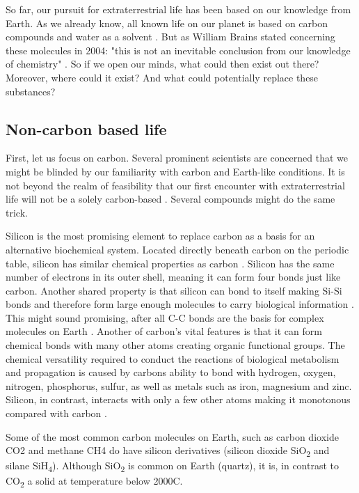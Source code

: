 ﻿So far, our pursuit for extraterrestrial life has been based on our knowledge from Earth.
As we already know, all known life on our planet is based on carbon compounds and water as a solvent \cite{OForm2}.
But as William Brains stated concerning these molecules in 2004: "this is not an inevitable conclusion from our knowledge of chemistry" \cite{OForm1}.
So if we open our minds, what could then exist out there?
Moreover, where could it exist?
And what could potentially replace these substances?

\subsection*{Non-carbon based life}

First, let us focus on carbon. Several prominent scientists are concerned that we might be blinded by our familiarity with carbon and Earth-like conditions.
It is not beyond the realm of feasibility that our first encounter with extraterrestrial life will not be a solely carbon-based \cite{OForm3}.
Several compounds might do the same trick.

Silicon is the most promising element to replace carbon as a basis for an alternative biochemical system. 
Located directly beneath carbon on the periodic table, silicon has similar chemical properties as carbon \cite{OForm4}.
Silicon has the same number of electrons in its outer shell, meaning it can form four bonds just like carbon.
Another shared property is that silicon can bond to itself making Si-Si bonds and therefore form large enough molecules to carry biological information \cite{OForm5}.
This might sound promising, after all C-C bonds are the basis for complex molecules on Earth \cite{OForm4}.
Another of carbon's vital features is that it can form chemical bonds with many other atoms creating organic functional groups.
The chemical versatility required to conduct the reactions of biological metabolism and propagation is caused by carbons ability to bond with hydrogen, oxygen, nitrogen, phosphorus, sulfur, as well as metals such as iron, magnesium and zinc.
Silicon, in contrast, interacts with only a few other atoms making it monotonous compared with carbon \cite{OForm5}.

Some of the most common carbon molecules on Earth, such as carbon dioxide CO2 and methane CH4 do have silicon derivatives (silicon dioxide SiO\textsubscript{2} and silane SiH\textsubscript{4}).
Although SiO\textsubscript{2} is common on Earth (quartz), it is, in contrast to CO\textsubscript{2} a solid at temperature below 2000\degree C.

